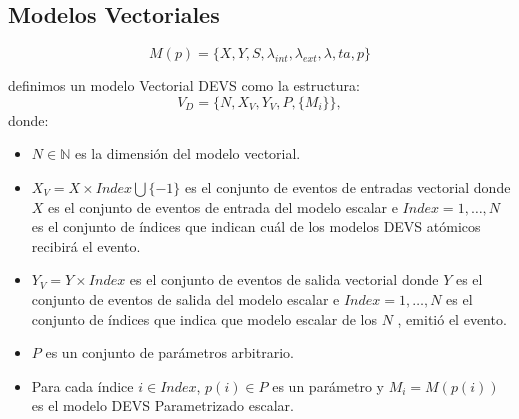 \documentclass{beamer}
\begin{document}
\subsection{Modelos Vectoriales}
\begin{frame}
	\begin{equation}
		M (p) = \{X, Y, S, \lambda_{int} , \lambda_{ext} , \lambda, ta, p\}
	\end{equation}

	definimos un modelo Vectorial DEVS\cite{BKC12} como la estructura:
	\begin{equation}
		V_D = \{N, X_V, Y_V, P, \{M_i\}\},
	\end{equation}
	donde:
	\begin{itemize}
		\item $N \in \mathbb{N}$ es la dimensión del modelo vectorial.

		\item $X_V = X \times Index \bigcup \{-1\}$ es el conjunto de eventos de entradas vectorial donde $X$ es el conjunto de eventos de entrada del modelo 
		escalar e $Index = {1, \ldots , N }$ es el conjunto de índices que indican cuál de los modelos DEVS atómicos recibirá el evento.

		\item $Y_V = Y \times Index$ es el conjunto de eventos de salida vectorial donde $Y$ es el conjunto de eventos de salida del modelo escalar e 
		$Index = {1, \ldots , N }$ es el conjunto de índices que indica que modelo escalar de los $N$ , emitió el evento. 

		\item $P$ es un conjunto de parámetros arbitrario.

		\item Para cada índice $i \in Index$, $p(i) \in P$ es un parámetro y $M_i = M (p(i))$ es el modelo DEVS Parametrizado escalar.
	\end{itemize}
\end{frame}
\end{document}
